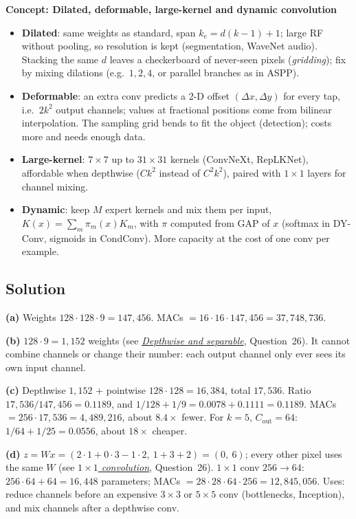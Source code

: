\documentclass[12pt,a4paper]{article}
\newcommand{\concept}[2]{\par\medskip\phantomsection\label{#1}{\large\bfseries\color{blue!50!black} Concept: #2}\par}
\newcommand{\seeconcept}[3]{(see \hyperref[#1]{\textit{#2}}, Question~#3)}
\begin{document}
\concept{c:convvariants}{Dilated, deformable, large-kernel and dynamic convolution}
\begin{itemize}[nosep]
\item \textbf{Dilated}: same weights as standard, span $k_e=d(k-1)+1$; large RF without pooling, so resolution is kept (segmentation, WaveNet audio). Stacking the same $d$ leaves a checkerboard of never-seen pixels (\emph{gridding}); fix by mixing dilations (e.g.\ $1,2,4$, or parallel branches as in ASPP).
\item \textbf{Deformable}: an extra conv predicts a 2-D offset $(\Delta x,\Delta y)$ for every tap, i.e.\ $2k^2$ output channels; values at fractional positions come from bilinear interpolation. The sampling grid bends to fit the object (detection); costs more and needs enough data.
\item \textbf{Large-kernel}: $7\times7$ up to $31\times31$ kernels (ConvNeXt, RepLKNet), affordable when depthwise ($Ck^2$ instead of $C^2k^2$), paired with $1\times1$ layers for channel mixing.
\item \textbf{Dynamic}: keep $M$ expert kernels and mix them per input, $K(x)=\sum_m\pi_m(x)K_m$, with $\pi$ computed from GAP of $x$ (softmax in DY-Conv, sigmoids in CondConv). More capacity at the cost of one conv per example.
\end{itemize}

\subsection*{Solution}
\textbf{(a)} Weights $128\cdot128\cdot9=147{,}456$. MACs $=16\cdot16\cdot147{,}456=37{,}748{,}736$.

\textbf{(b)} $128\cdot9=1{,}152$ weights \seeconcept{c:depthwise}{Depthwise and separable}{26}. It cannot combine channels or change their number: each output channel only ever sees its own input channel.

\textbf{(c)} Depthwise $1{,}152$ + pointwise $128\cdot128=16{,}384$, total $17{,}536$. Ratio $17{,}536/147{,}456=0.1189$, and $1/128+1/9=0.0078+0.1111=0.1189$. MACs $=256\cdot17{,}536=4{,}489{,}216$, about $8.4\times$ fewer. For $k=5$, $C_{\text{out}}=64$: $1/64+1/25=0.0556$, about $18\times$ cheaper.

\textbf{(d)} $z=Wx=(2\cdot1+0\cdot3-1\cdot2,\ 1+3+2)=(0,\ 6)$; every other pixel uses the same $W$ \seeconcept{c:pointwise}{$1\times1$ convolution}{26}. $1\times1$ conv $256\to64$: $256\cdot64+64=16{,}448$ parameters; MACs $=28\cdot28\cdot64\cdot256=12{,}845{,}056$. Uses: reduce channels before an expensive $3\times3$ or $5\times5$ conv (bottlenecks, Inception), and mix channels after a depthwise conv.
\end{document}
